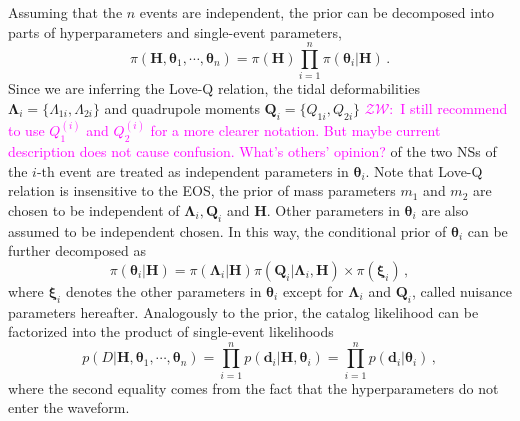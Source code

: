 \documentclass[a4paper,11pt]{article}
\newcommand{\ZW}[1]{\textcolor{magenta}{$\mathcal{ZW}$:~#1}}
\begin{document}
Assuming that the $n$ events are independent, the 
prior can be decomposed into parts of hyperparameters and single-event parameters,
\begin{equation}
\label{bayes3}
\pi(\bm{H},\bm{\theta}_1,\cdots,\bm{\theta}_n) = \pi(\bm{H}) \prod_{i=1}^n \pi(\bm{\theta}_i|\bm{H})\,.
\end{equation}
Since we are inferring the Love-Q relation, the tidal deformabilities $\bm
{\Lambda}_i=\{\Lambda_{1i},\Lambda_{2i}\}$ and quadrupole moments $\bm{Q}_i=\{Q_
{1i},Q_{2i}\}$ \ZW{I still recommend to use $Q^{(i)}_1$ and $Q^{(i)}_2$ for a
more clearer notation. But maybe current description does not cause confusion.
What's others' opinion?
} of the two NSs of the $i\text{-th}$ event are treated as independent
parameters in $\bm{\theta}_i$. Note that Love-Q relation is insensitive 
to the EOS, the prior of mass parameters $m_1$ and $m_2$ are chosen to be
independent of $\bm{\Lambda}_i, \bm{Q}_i$ and $\bm{H}$. Other parameters in
$\bm{\theta}_i$ are also assumed to be independent chosen. 
In this way, the conditional prior of $\bm{\theta}_i$
 can be further decomposed as
\begin{equation}
\label{prior}
\pi(\bm{\theta}_i|\bm{H})=\pi(\bm{\Lambda}_i|\bm{H})\pi(\bm{Q}_i|\bm{\Lambda}_i,\bm{H})\times\pi(\bm{\xi}_i)\,,
\end{equation}
where $\bm{\xi}_i$ denotes the other parameters in $\bm{\theta}_i$ except for
$\bm{\Lambda}_i$ and $\bm{Q}_i$, called nuisance parameters hereafter.
Analogously to the prior, the catalog likelihood can be factorized
 into the product of single-event likelihoods
\begin{equation}
    p(D|\bm{H},\bm{\theta}_1,\cdots,\bm{\theta}_n)=\prod_{i=1}^{n}p(\bm{d}_i|\bm{H},\bm{\theta}_i)=\prod_{i=1}^{n}p(\bm{d}_i|\bm{\theta}_i)\,,\label{eq:catalog_likelihood}
\end{equation}
where the second equality comes from the fact that the hyperparameters do not enter the waveform.
\end{document}
